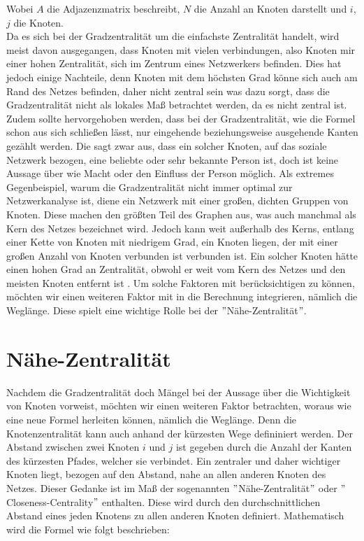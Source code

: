 Wobei $A$ die Adjazenzmatrix beschreibt, $N$ die Anzahl an Knoten darstellt und $i$, $j$ die Knoten. \\
Da es sich bei der Gradzentralität um die einfachste Zentralität handelt, wird meist davon ausgegangen, dass Knoten mit vielen verbindungen, also Knoten mir einer hohen Zentralität, sich im Zentrum eines Netzwerkers befinden. Dies hat jedoch einige Nachteile, denn Knoten mit dem höchsten Grad könne sich auch am Rand des Netzes befinden, daher nicht zentral sein was dazu sorgt, dass die Gradzentralität nicht als lokales Maß betrachtet werden, da es nicht zentral ist. Zudem sollte hervorgehoben werden, dass bei der Gradzentralität, wie die Formel schon aus sich schließen lässt, nur eingehende beziehungsweise ausgehende Kanten gezählt werden. Die sagt zwar aus, dass ein solcher Knoten, auf das soziale Netzwerk bezogen, eine beliebte oder sehr bekannte Person ist, doch ist keine Aussage über wie Macht oder den Einfluss der Person möglich. Als extremes Gegenbeispiel, warum die Gradzentralität nicht immer optimal zur Netzwerkanalyse ist, diene ein Netzwerk mit einer großen, dichten Gruppen von Knoten. Diese machen den größten Teil des Graphen aus, was auch manchmal als Kern des Netzes bezeichnet wird. Jedoch kann weit außerhalb des Kerns, entlang einer Kette von Knoten mit niedrigem Grad, ein Knoten liegen, der mit einer großen Anzahl von Knoten verbunden ist
verbunden ist. Ein solcher Knoten hätte einen hohen Grad an
Zentralität, obwohl er weit vom Kern des Netzes und den meisten Knoten entfernt ist \cite{SpringerElbert}. 
Um solche Faktoren mit berücksichtigen zu können, möchten wir einen weiteren Faktor mit in die Berechnung integrieren, nämlich die Weglänge. Diese spielt eine wichtige Rolle bei der $"$Nähe-Zentralität$"$.  
\section{Nähe-Zentralität}
Nachdem die Gradzentralität doch Mängel bei der Aussage über die Wichtigkeit von Knoten vorweist, möchten wir einen weiteren Faktor betrachten, woraus wie eine neue Formel herleiten können, nämlich die Weglänge. Denn die Knotenzentralität kann auch anhand der kürzesten Wege defininiert werden. Der Abstand zwischen zwei Knoten $i$ und $j$ ist gegeben durch die Anzahl der Kanten des kürzesten Pfades, welcher sie verbindet. Ein zentraler und daher wichtiger Knoten liegt, bezogen auf den Abstand, nahe an allen anderen Knoten des Netzes. Dieser Gedanke ist im Maß der sogenannten $"$Nähe-Zentralität$"$ oder $"$Closeness-Centrality$"$ enthalten. Diese wird durch den durchschnittlichen Abstand eines jeden Knotens zu allen anderen Knoten definiert. Mathematisch wird die Formel wie folgt beschrieben: 


